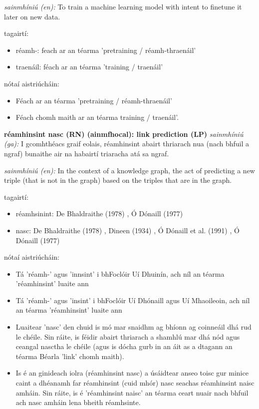 \documentclass{article}
\begin{document}
\textit{sainmhíniú (en):} To train a machine learning model with intent to finetune it later on new data.

tagairtí:
\begin{itemize}
	\item réamh-: feach ar an téarma 'pretraining / réamh-thraenáil'
	\item traenáil: féach ar an téarma 'training / traenáil'
\end{itemize}

nótaí aistriúcháin:
\begin{itemize}
	\item Féach ar an téarma 'pretraining / réamh-thraenáil'
	\item Féach chomh maith ar an téarma training / traenáil'.
\end{itemize}


\textbf{réamhinsint nasc (RN) (ainmfhocal): link prediction (LP)}
\textit{sainmhíniú (ga):} I gcomhthéacs graif eolais, réamhinsint abairt thriarach nua (nach bhfuil a ngraf) bunaithe air na habairtí triaracha atá sa ngraf.

\textit{sainmhíniú (en):} In the context of a knowledge graph, the act of predicting a new triple (that is not in the graph) based on the triples that are in the graph.

tagairtí:
\begin{itemize}
	\item réamhsinint: De Bhaldraithe (1978) \cite{de-bhaldraithe}, Ó Dónaill (1977) \cite{odonaill}
	\item nasc: De Bhaldraithe (1978) \cite{de-bhaldraithe}, Dineen (1934) \cite{dineen}, Ó Dónaill et al. (1991) \cite{focloir-beag}, Ó Dónaill (1977) \cite{odonaill}
\end{itemize}

nótaí aistriúcháin:
\begin{itemize}
	\item Tá 'réamh-' agus 'innsint' i bhFoclóir Uí Dhuinín, ach níl an téarma 'réamhinsint' luaite ann
	\item Tá 'réamh-' agus 'insint' i bhFoclóir Uí Dhónaill agus Uí Mhaoileoin, ach níl an téarma 'réamhinsint' luaite ann
	\item Luaitear 'nasc' den chuid is mó mar snaidhm ag bhíonn ag coinneáil dhá rud le chéile. Sin ráite, is féidir abairt thriarach a shamhlú mar dhá nód agus ceangal nasctha le chéile (agus is dócha gurb in an áit as a dtagann an téarma Béarla 'link' chomh maith).
	\item Is é an ginideach iolra (réamhinsint nasc) a úsáidtear anseo toisc gur minice caint a dhéanamh far réamhinsint (cuid mhór) nasc seachas réamhinsint naisc amháin. Sin ráite, is é 'réamhinsint naisc' an téarma ceart nuair nach bhfuil ach nasc amháin lena bheith réamhsinte.
\end{itemize}
\end{document}
